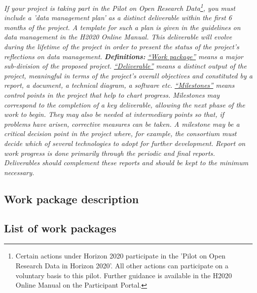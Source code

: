 {\vskip0.2cm
\emph{If your project is taking part in the Pilot on Open Research Data\footnote{Certain actions under Horizon 2020 participate in the 'Pilot on Open Research Data in Horizon 2020'. All other actions can participate on a voluntary basis to this pilot.  Further guidance is available in the H2020 Online Manual on the Participant Portal.}, you must include a 'data management plan' as a distinct deliverable within the first 6 months of the project. A template for such a plan is given in the guidelines on data management in the H2020 Online Manual. This deliverable will evolve during the lifetime of the project in order to present the status of the project's reflections on data management.}
\vskip0.2cm
\emph{\noindent \textbf{Definitions:}}
\vskip0.2cm
\emph{\ul{``Work package''} means a major sub-division of the proposed project.}
\vskip0.2cm
\emph{\ul{``Deliverable''} means a distinct output of the project, meaningful in terms of the project's overall objectives and constituted by a report, a document, a technical diagram, a software etc.}
\vskip0.2cm
\emph{\ul{``Milestones''} means control points in the project that help to chart progress. Milestones may correspond to the completion of a key deliverable, allowing the next phase of the work to begin. They may also be needed at intermediary points so that, if problems have arisen, corrective measures can be taken. A milestone may be a critical decision point in the project where, for example, the consortium must decide which of several technologies to adopt for further development.}
\vskip0.2cm
\emph{\noindent Report on work progress is done primarily through the periodic and final reports. Deliverables should complement these reports and should be kept to the minimum necessary.}
}

%

\subsection{Work package description}
\label{sec:wps}

\subsection{List of work packages}
\label{sec:wplist}
\makewplist




